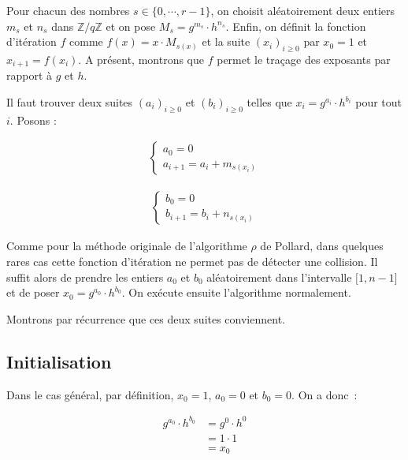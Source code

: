 		Pour chacun des nombres $s \in \{0,\cdots,r-1\}$, on choisit aléatoirement deux entiers $m_s$ et $n_s$ dans $\mathbb{Z}/q\mathbb{Z}$ et on pose $M_s = g^{m_s} \cdot h^{n_s}$. Enfin, on définit la fonction d'itération $f$ comme $f(x) = x \cdot M_{s(x)}$ et la suite $(x_i)_{i \ge 0}$ par $x_0 = 1$ et $x_{i+1} = f(x_i)$. A présent, montrons que $f$ permet le traçage des exposants par rapport à $g$ et $h$.

		Il faut trouver deux suites $(a_i)_{i \ge 0}$ et $(b_i)_{i \ge 0}$ telles que $x_i = g^{a_i} \cdot h^{b_i}$ pour tout $i$. Posons :

		\begin{align*}
      \begin{cases}
        a_0 = 0 \\
        a_{i+1} = a_i + m_{s(x_i)}
      \end{cases}
    \end{align*}

    \begin{align*}
      \begin{cases}
        b_0 = 0 \\
        b_{i+1} = b_i + n_{s(x_i)}
      \end{cases}
    \end{align*}

		Comme pour la méthode originale de l'algorithme $\rho$ de Pollard, dans quelques rares cas cette fonction d'itération ne permet pas de détecter une collision. Il suffit alors de prendre les entiers $a_0$ et $b_0$ aléatoirement dans l'intervalle $\mathopen{[}1,n-1\mathclose{]}$ et de poser $x_0 = g^{a_0} \cdot h^{b_0}$. On exécute ensuite l'algorithme normalement.

		Montrons par récurrence que ces deux suites conviennent.

		\subsection*{Initialisation}

		Dans le cas général, par définition, $x_0 = 1$, $a_0 = 0$ et $b_0 = 0$. On a donc~:

		\begin{align*}
          g^{a_0} \cdot h^{b_0} &= g^{0} \cdot h^{0} \\
                                &= 1 \cdot 1 \\
                                &= x_0
        \end{align*}

